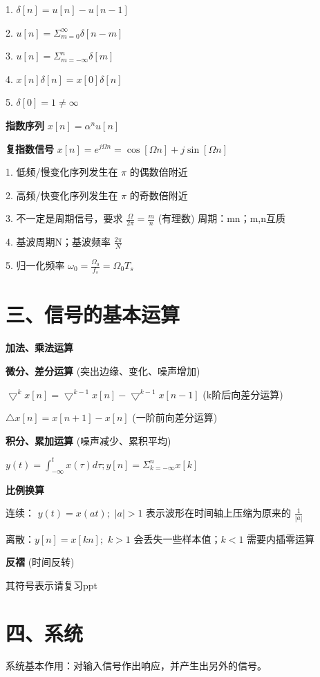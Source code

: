 1. $\delta[n] = u[n] - u[n-1]$

2. $u[n]=\Sigma ^{\infty} _{m=0} \delta[n-m]$

3. $u[n]=\Sigma ^{n} _{m=-\infty} \delta[m]$

4. $x[n]\delta[n]=x[0]\delta[n]$

5. $\delta[0]=1 \ne \infty$

\textbf{指数序列} $x[n] = \alpha^n u[n]$

\textbf{复指数信号} $x[n]=e^{j\Omega n} = \cos[\Omega n] + j\sin[\Omega n]$

1. 低频/慢变化序列发生在 $\pi$ 的偶数倍附近

2. 高频/快变化序列发生在 $\pi$ 的奇数倍附近

3. 不一定是周期信号，要求 $\frac{\Omega}{2\pi}= \frac{m}{n}$ (有理数) 周期：mn；m,n互质

4. 基波周期N；基波频率 $\frac{2\pi}{N}$

5. 归一化频率 $\omega _0 = \frac{\Omega _0}{f_s} = \Omega _0 T_s$

\section*{三、信号的基本运算}

\textbf{加法、乘法运算}

\textbf{微分、差分运算} (突出边缘、变化、噪声增加)

$\bigtriangledown ^k x[n] = \bigtriangledown ^{k-1} x[n] - \bigtriangledown ^{k-1} x[n-1]$ (k阶后向差分运算)

$\bigtriangleup x[n] = x[n+1] - x[n]$ (一阶前向差分运算)

\textbf{积分、累加运算} (噪声减少、累积平均)

$y(t) = \int ^{t} _{-\infty} x(\tau) d\tau; y[n] = \Sigma ^{n} _{k=- \infty} x[k]$

\textbf{比例换算}

连续： $y(t) =x(at);$ $|a| > 1$ 表示波形在时间轴上压缩为原来的 $\frac{1}{|a|}$

离散：$y[n]=x[kn];$ $k>1$ 会丢失一些样本值；$k<1$ 需要内插零运算

\textbf{反褶} (时间反转)

其符号表示请复习ppt

\section*{四、系统}

系统基本作用：对输入信号作出响应，并产生出另外的信号。


